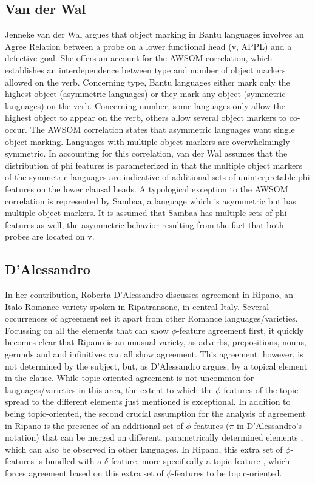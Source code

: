 \documentclass[output=paper
,modfonts
,nonflat]{langsci/langscibook}
\begin{document}
\subsection{Van der Wal}
\label{sec:vdwal}

Jenneke van der Wal argues that object marking in Bantu languages involves an Agree Relation between a probe on a lower functional head (v, APPL) and a defective goal. She offers an account for the AWSOM correlation, which establishes an interdependence between type and number of object markers allowed on the verb. Concerning type, Bantu languages either mark only the highest object (asymmetric languages) or they mark any object (symmetric languages) on the verb. Concerning number, some languages only allow the highest object to appear on the verb, others allow several object markers to co-occur. The AWSOM correlation states that asymmetric languages want single object marking. Languages with multiple object markers are overwhelmingly symmetric. In accounting for this correlation, van der Wal assumes that the distribution of phi features is parameterized in that the multiple object markers of the symmetric languages are indicative of additional sets of uninterpretable phi features on the lower clausal heads. A typological exception to the AWSOM correlation is represented by Sambaa, a language which is asymmetric but has multiple object markers. It is assumed that Sambaa has multiple sets of phi features as well, the asymmetric behavior resulting from the fact that both probes are located on v. 

\subsection{D'Alessandro}
\label{sec:dalessandro}

In her contribution, Roberta D'Alessandro discusses agreement in Ripano, an Italo-Romance variety spoken in Ripatransone, in central Italy. Several occurrences of agreement set it apart from other Romance languages/varieties. Focussing on all the elements that can show $\phi$-feature agreement first, it quickly becomes clear that Ripano is an unusual variety, as adverbs, prepositions, nouns, gerunds and and infinitives can all show agreement. This agreement, however, is not determined by the subject, but, as D'Alessandro argues, by a topical element in the clause. While topic-oriented agreement is not uncommon for languages/varieties in this area, the extent to which the $\phi$-features of the topic spread to the different elements just mentioned is exceptional. In addition to being topic-oriented, the second crucial assumption for the analysis of agreement in Ripano is the presence of an additional set of $\phi$-features ($\pi$ in D'Alessandro's notation) that can be merged on different, parametrically determined elements \citep{DAlessandro2017}, which can also be observed in other languages. In Ripano, this extra set of $\phi$-features is bundled with a $\delta$-feature, more specifically a topic feature \citep{Miyagawa2017}, which forces agreement based on this extra set of $\phi$-features to be topic-oriented.
\end{document}
